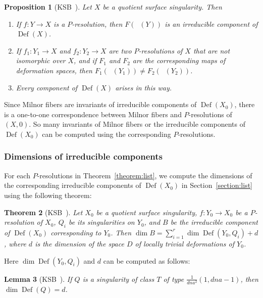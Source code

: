 \documentclass[reqno, twoside, a4paper]{amsart}
\newtheorem{theorem}{Theorem}[section]
\newtheorem{lemma}[theorem]{Lemma}
\newtheorem{proposition}[theorem]{Proposition}
\theoremstyle{definition}
\numberwithin{equation}{section}
\DeclareMathOperator{\Def}{Def}
\DeclareMathOperator{\DefQG}{Def^{\mathrm{QG}}}
\begin{document}
\begin{proposition}[{KSB~\cite[Theorem~3.9]{KSB-1988}}]
\label{proposition:KSB-P-resolution-vs-components}
Let $X$ be a quotient surface singularity. Then

\begin{enumerate}
\item If $f \colon Y \to X$ is a $P$-resolution, then $F(\DefQG(Y))$ is an irreducible component of $\Def(X)$.

\item If $f_1 \colon Y_1 \to X$ and $f_2 \colon Y_2 \to X$ are two $P$-resolutions of $X$ that are not isomorphic over $X$, and if $F_1$ and $F_2$ are the corresponding maps of deformation spaces, then $F_1(\DefQG(Y_1)) \neq F_2(\DefQG(Y_2))$.

\item Every component of $\Def(X)$ arises in this way.
\end{enumerate}
\end{proposition}

Since Milnor fibers are invariants of irreducible components of $\Def(X_0)$, there is a one-to-one correspondence between Milnor fibers and $P$-resolutions of $(X,0)$. So many invariants of Milnor fibers or the irreducible components of $\Def(X_0)$ can be computed using the corresponding $P$-resolutions.






\subsubsection{Dimensions of irreducible components}

For each $P$-resolutions in Theorem~\ref{theorem:list}, we compute the dimensions of the corresponding irreducible components of $\Def(X_0)$ in Section~\ref{section:list} using the following theorem:

\begin{theorem}[{KSB~\cite[Corollary 3.20]{KSB-1988}}]
Let $X_0$ be a quotient surface singularity, $f \colon Y_0 \to X_0$ be a $P$-resolution of $X_0$, $Q_i$ be its singularities on $Y_0$, and $B$ be the irreducible component of $\Def(X_0)$ corresponding to $Y_0$. Then $\dim{B} = \sum_{i=1}^r \dim{\Def(Y_0, Q_i)}+d$, where $d$ is the dimension of the space $D$ of locally trivial deformations of $Y_0$.
\end{theorem}
%
Here $\dim{\Def(Y_0, Q_i)}$ and $d$ can be computed as follows:

\begin{lemma}[{KSB~\cite[Lemma 3.21]{KSB-1988}}]
If $Q$ is a singularity of class $T$ of type $\frac{1}{dna^2}(1, dna-1)$, then $\dim{\Def(Q)}=d$.
\end{lemma}
\end{document}
